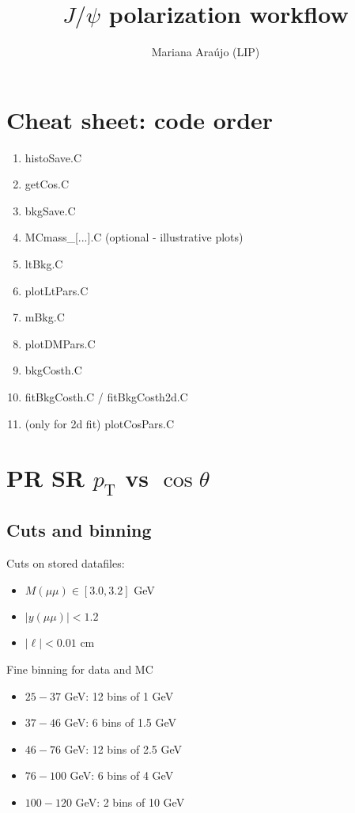 \documentclass{article}
\newcommand{\pt}{p_\text{T}}
\newcommand{\cost}{\cos\theta}
\begin{document}
\title{$J/\psi$ polarization workflow }
\author{Mariana Ara\'ujo (LIP)}
\maketitle

\tableofcontents

\pagebreak

\section{Cheat sheet: code order}

\begin{enumerate}
\item histoSave.C
\item getCos.C
\item bkgSave.C
\item MCmass\_[...].C (optional - illustrative plots)
\item ltBkg.C
\item plotLtPars.C
\item mBkg.C
\item plotDMPars.C
\item bkgCosth.C
\item fitBkgCosth.C / fitBkgCosth2d.C
\item (only for 2d fit) plotCosPars.C
\end{enumerate}

\pagebreak

\section{PR SR $\pt$ vs $\cost$}
\subsection{Cuts and binning} 

Cuts on stored datafiles:
\begin{itemize}
\item $M(\mu\mu)\in[3.0,3.2]$ GeV
\item $|y(\mu\mu)|<1.2$
\item $|\ell|<0.01$ cm
\end{itemize}

Fine binning for data and MC
\begin{itemize}
\item $25-37$ GeV: 12 bins of 1 GeV
\item $37-46$ GeV: 6 bins of 1.5 GeV
\item $46-76$ GeV: 12 bins of 2.5 GeV
\item $76-100$ GeV: 6 bins of 4 GeV
\item $100-120$ GeV: 2 bins of 10 GeV
\end{itemize}
\end{document}
